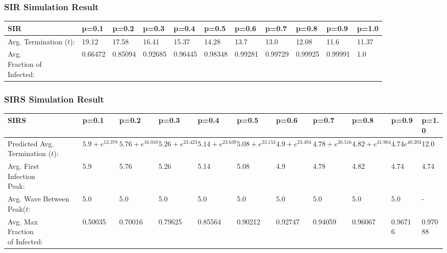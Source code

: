 \documentclass{subfile}
\begin{document}
  \subsubsection{SIR Simulation Result}
  {
  \begin{adjustbox}{max width=1.1\textwidth,center}
  \begin{tabular}{|l|l|l|l|l|l|l|l|l|l|l|}
    \hline
    SIR & p=0.1 & p=0.2 & p=0.3 & p=0.4 & p=0.5 & p=0.6 & p=0.7 & p=0.8 & p=0.9 & p=1.0\\
    \hline
    \makecell{Avg.\\Termination\\(\(t\)):} & 19.12 & 17.58 & 16.41 & 15.37 & 14.28 & 13.7 & 13.0 & 12.08 & 11.6 & 11.37\\
    \hline
    \makecell{Avg.\\Fraction of\\ Infected:} & 0.66472 & 0.85094 & 0.92685 & 0.96445 & 0.98348 & 0.99281 & 0.99729 & 0.99925 & 0.99991 & 1.0\\
    \hline
  \end{tabular}
  \end{adjustbox}}

  \subsubsection{SIRS Simulation Result}
  {
  \begin{adjustbox}{max width=1.2\textwidth,center}
  \begin{tabular}{|l|l|l|l|l|l|l|l|l|l|l|}
    \hline
    SIRS & p=0.1 & p=0.2 & p=0.3 & p=0.4 & p=0.5 & p=0.6 & p=0.7 & p=0.8 & p=0.9 & p=1.0\\
    \hline
    \makecell{Predicted\\Avg.\\Termination\\(\(t\))}: & \(5.9 + e^{12.378}\) & \(5.76 + e^{16.010}\) & \(5.26 + e^{23.423}\) & \(5.14 + e^{23.639}\) & \(5.08+e^{23.153}\) & \(4.9+e^{23.494}\) & \(4.78+e^{26.516}\) & \(4.82+e^{31.904}\) & \(4.74e^{40.203}\) & 12.0\footnotemark\\
    \hline
    \makecell{Avg. First\\Infection\\Peak:} & 5.9 & 5.76 & 5.26 & 5.14 & 5.08 & 4.9 & 4.78 & 4.82 & 4.74 & 4.74\\
    \hline
    \makecell{Avg. Wave\\Between Peak(\(t\):} & 5.0 & 5.0 & 5.0 & 5.0 & 5.0 & 5.0 & 5.0 & 5.0 & 5.0 & -\footnotemark\\
    \hline
    \makecell{Avg. Max\\Fraction\\of Infected:} & 0.50035 &  0.70016 & 0.79625 & 0.85564 & 0.90212 & 0.92747 & 0.94059 & 0.96067 & 0.96716 & 0.97088\\
    \hline
  \end{tabular}
  \end{adjustbox}}
\end{document}
